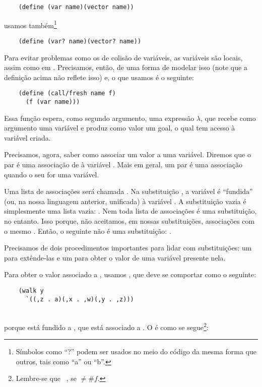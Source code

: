 \documentclass{article}
\begin{document}
  \begin{lstlisting}
    (define (var name)(vector name))
  \end{lstlisting}

  \noindent usamos também\footnote{Símbolos como ``?'' podem ser
    usados no meio do código da mesma forma que outros, tais como ``a'' ou ``b''.}

  \begin{lstlisting}
    (define (var? name)(vector? name))
  \end{lstlisting}

  Para evitar problemas como os de colisão de variáveis, as variáveis
  são locais, assim como em . Precisamos, então, de
  uma forma de modelar isso (note que a definição acima não reflete
  isso) e, o que usamos é o seguinte:

  \begin{lstlisting}
    (define (call/fresh name f)
      (f (var name)))
  \end{lstlisting}

  Essa função espera, como segundo argumento, uma expressão $\lambda$, que
  recebe como argumento uma variável e produz como valor um goal, o qual
  tem acesso à variável criada.
  
  Precisamos, agora, saber como associar um valor a uma
  variável. Diremos que o par  é uma associação de
   à variável . Mais em geral, um par é uma
  associação quando o seu  for uma variável.

  Uma lista de associações será chamada . Na
  substituição , a variável  é
  ``fundida'' (ou, na nossa linguagem anterior, unificada) à variável
  . A substituição vazia é simplesmente uma lista vazia:
  . Nem toda lista de associações é uma
  substituição, no entanto. Isso porque, não aceitamos, em nossas
  substituições, associações com o mesmo . Então, o
  seguinte não é uma substituição: .

  Precisamos de dois procedimentos importantes para lidar com
  substituições: um para extênde-las e um para obter o valor de uma
  variável presente nela.

  Para obter o valor associado a , usamos ,
  que deve se comportar como o seguinte:
  \begin{lstlisting}
    (walk y
      `((,z . a)(,x . ,w)(,y . ,z)))
  \end{lstlisting}
  \hspace{1cm} \seta\ \\
  porque  está fundido a , que está associado
  a . O  é como se
  segue\footnote{Lembre-se que  \seta\ ,
    se  $\neq \#f$.}:
\end{document}
